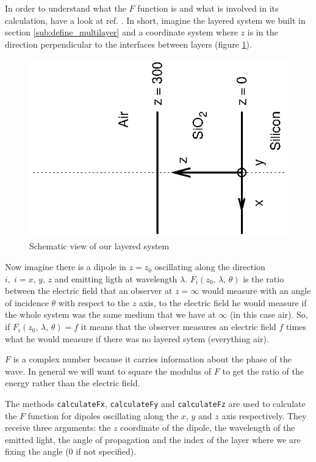 \documentclass[a4paper,11pt,aps,final]{revtex4}
\begin{document}
In order to understand what the $F$ function is and what is involved in its calculation, have a look at ref. \cite{crawford88}. In short, imagine the layered system we built in section \ref{sub:define_multilayer} and a coordinate system where $z$ is in the direction perpendicular to the interfaces between layers (figure \ref{fig:diagram}).

\begin{figure}
    \centering
    \includegraphics[scale=1,angle=-90]{figure.ps}
    \caption{Schematic view of our layered system}
    \label{fig:diagram}
\end{figure}

Now imagine there is a dipole in $z = z_0$ oscillating along the direction $i,\;i=x,\,y,\,z$ and emitting ligth at wavelength $\lambda$. $F_i(z_0,\, \lambda,\, \theta)$ is the ratio between the electric field that an observer at $z = \infty$ would measure with an angle of incidence $\theta$ with respect to the $z$ axis, to the electric field he would measure if the whole system was the same medium that we have at $\infty$ (in this case air). So, if $F_i(z_0,\, \lambda,\, \theta) = f$ it means that the observer measures an electric field $f$ times what he would measure if there was no layered sytem (everything air).

$F$ is a complex number because it carries information about the phase of the wave. In general we will want to square the modulus of $F$ to get the ratio of the energy rather than the electric field.

The methods \texttt{calculateFx}, \texttt{calculateFy} and \texttt{calculateFz} are used to calculate the $F$ function for dipoles oscillating along the $x$, $y$ and $z$ axis respectively. They receive three arguments: the $z$ coordinate of the dipole, the wavelength of the emitted light, the angle of propagation and the index of the layer where we are fixing the angle (0 if not specified).
\end{document}
